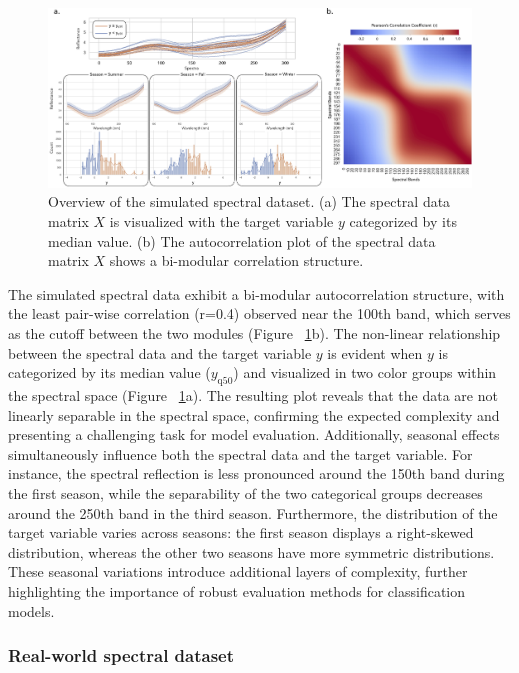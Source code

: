 \begin{figure}[H]
    \centering
    \includegraphics[width=1\textwidth]{fig_2.jpg}
    \caption{Overview of the simulated spectral dataset. (a) The spectral data matrix $X$ is visualized with the target variable $y$ categorized by its median value. (b) The autocorrelation plot of the spectral data matrix $X$ shows a bi-modular correlation structure.}
    \label{fig:2_sim_data}
\end{figure}

The simulated spectral data exhibit a bi-modular autocorrelation structure, with the least pair-wise correlation (r=0.4) observed near the 100th band, which serves as the cutoff between the two modules (Figure ~\ref{fig:2_sim_data}b). The non-linear relationship between the spectral data and the target variable $y$ is evident when $y$ is categorized by its median value ($y_{\text{q}50}$) and visualized in two color groups within the spectral space (Figure ~\ref{fig:2_sim_data}a). The resulting plot reveals that the data are not linearly separable in the spectral space, confirming the expected complexity and presenting a challenging task for model evaluation. Additionally, seasonal effects simultaneously influence both the spectral data and the target variable. For instance, the spectral reflection is less pronounced around the 150th band during the first season, while the separability of the two categorical groups decreases around the 250th band in the third season. Furthermore, the distribution of the target variable varies across seasons: the first season displays a right-skewed distribution, whereas the other two seasons have more symmetric distributions. These seasonal variations introduce additional layers of complexity, further highlighting the importance of robust evaluation methods for classification models.

\subsubsection{Real-world spectral dataset}

